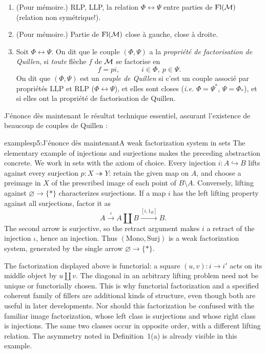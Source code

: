 \begin{enumerate}[label={}]
\item[\textit{a})] (Pour mémoire.) RLP, LLP, la relation $\Phi \longleftrightarrow \Psi$ entre parties de $\mathrm{Fl}(\mathcal{M})$ (relation non symétrique!).

\item[\textit{b})] (Pour mémoire.) Partie de $\mathrm{Fl}(\mathcal{M})$ close à gauche, close à droite.

\item[\textit{c})] Soit $\Phi \longleftrightarrow \Psi$. On dit que le couple $(\Phi, \Psi)$ a la \textit{propriété de factorisation de Quillen}, si \textit{toute} flèche $f$ de $\mathcal{M}$ se factorise en
\[
f = pi, \qquad\quad i \in \Phi,\ p \in \Psi.
\]
On dit que $(\Phi, \Psi)$ est un \textit{couple de Quillen} si c'est un couple associé par propriétés LLP et RLP ($\Phi \longleftrightarrow \Psi$), et elles sont closes (\textit{i.e.} $\Phi = \Psi^*$, $\Psi = \Phi_*$), et si elles ont la propriété de factorisation de Quillen.
\end{enumerate}

J'énonce dès maintenant le résultat technique essentiel, assurant l'existence de beaucoup de couples de Quillen :

\begin{dcomment}{examples}{p5:J'énonce dès maintenant}{A weak factorization system in sets}
The elementary example of injections and surjections makes the preceding abstraction concrete. We work in sets with the axiom of choice. Every injection $i:A\hookrightarrow B$ lifts against every surjection $p:X\twoheadrightarrow Y$: retain the given map on $A$, and choose a preimage in $X$ of the prescribed image of each point of $B\setminus A$. Conversely, lifting against $\varnothing\to\{*\}$ characterizes surjections. If a map $i$ has the left lifting property against all surjections, factor it as
\[
 A\xrightarrow{\iota} A\amalg B
     \xrightarrow{[i,1_B]} B.
\]
The second arrow is surjective, so the retract argument makes $i$ a retract of the injection $\iota$, hence an injection. Thus $(\mathrm{Mono},\mathrm{Surj})$ is a weak factorization system, generated by the single arrow $\varnothing\to\{*\}$.

The factorization displayed above is functorial: a square $(u,v):i\to i'$ acts on its middle object by $u\amalg v$. The diagonal in an arbitrary lifting problem need not be unique or functorially chosen. This is why functorial factorization and a specified coherent family of fillers are additional kinds of structure, even though both are useful in later developments. Nor should this factorization be confused with the familiar image factorization, whose left class is surjections and whose right class is injections. The same two classes occur in opposite order, with a different lifting relation. The asymmetry noted in Definition~1(a) is already visible in this example.
\end{dcomment}


